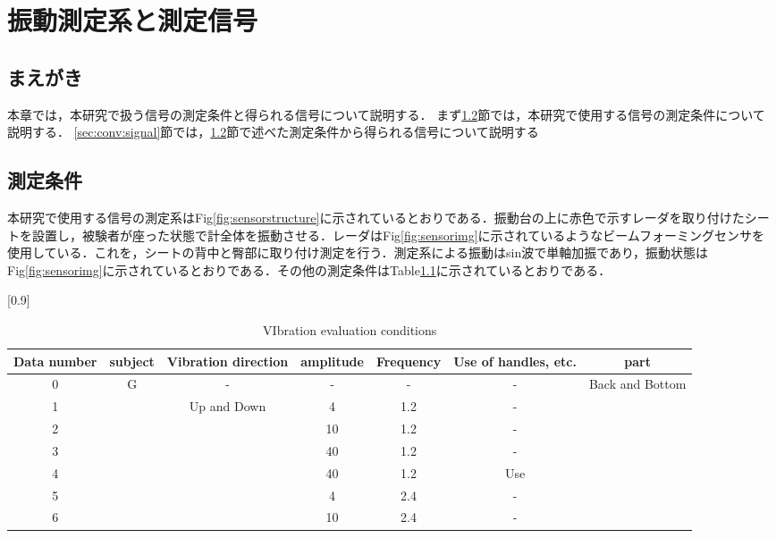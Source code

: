 \chapter{振動測定系と測定信号}
\label{chap:measurementstructsig}

\section{まえがき}
本章では，本研究で扱う信号の測定条件と得られる信号について説明する．
まず\ref{sec:conv:measurementcondition}節では，本研究で使用する信号の測定条件について説明する．
\ref{sec:conv:signal}節では，\ref{sec:conv:measurementcondition}節で述べた測定条件から得られる信号について説明する

\section{測定条件}
\label{sec:conv:measurementcondition}
本研究で使用する信号の測定系はFig\ref{fig:sensorstructure}に示されているとおりである．振動台の上に赤色で示すレーダを取り付けたシートを設置し，被験者が座った状態で計全体を振動させる．レーダはFig\ref{fig:sensorimg}に示されているようなビームフォーミングセンサを使用している．これを，シートの背中と臀部に取り付け測定を行う．測定系による振動はsin波で単軸加振であり，振動状態はFig\ref{fig:sensorimg}に示されているとおりである．その他の測定条件はTable\ref{tab:vibevacondition}に示されているとおりである．


\begin{table}[b]
  \caption{VIbration evaluation conditions}
  \centering
  \scalebox{0.8}[0.9]{
  \begin{tabular}{|c|c|c|c|c|c|c|} \hline
    Data number & subject & Vibration direction & amplitude & Frequency &  Use of handles, etc. & part \\ \hline \hline
    0 & \multirow{7}{*}{G} & - & - & - & - & \multirow{7}{*}{Back and Bottom}   \\ \cline{1-1} \cline{3-3} \cline{4-4} \cline{5-5} \cline{6-6}
    1 & & \multirow{6}{*}{Up and Down} & 4 & 1.2 & - &  \\ \cline{1-1} \cline{4-4} \cline{5-5} \cline{6-6}
    2 & &  & 10 & 1.2 & - &   \\ \cline{1-1} \cline{4-4} \cline{5-5} \cline{6-6}
    3 & &  & 40 & 1.2 & - &   \\ \cline{1-1} \cline{4-4} \cline{5-5} \cline{6-6}
    4 & &  & 40 & 1.2 & Use &   \\ \cline{1-1} \cline{4-4} \cline{5-5} \cline{6-6}
    5 & &  & 4 & 2.4 & - &   \\ \cline{1-1} \cline{4-4} \cline{5-5} \cline{6-6}
    6 & &  & 10 & 2.4 & - &   \\ \hline
  \end{tabular}
  }
  \label{tab:vibevacondition}
\end{table}

